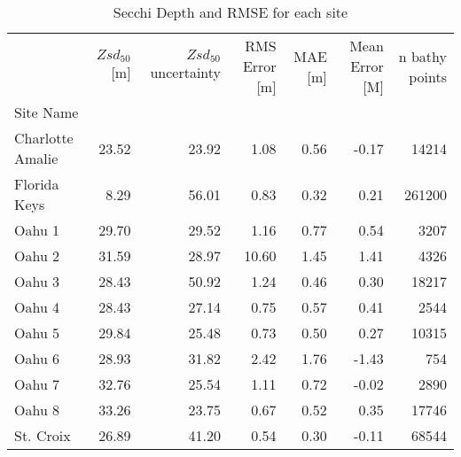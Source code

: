 \begin{table}
\centering
\caption{Secchi Depth and RMSE for each site}
\label{tab:ocean_color_summary_by_site}
\begin{tabular}{lrrrrrr}
\toprule
{} &  $Zsd_{50}$[m] &  $Zsd_{50}$ uncertainty &  RMS Error [m] &  MAE [m] &  Mean Error [M] &  n bathy points \\
Site Name        &                &                         &                &          &                 &                 \\
\midrule
Charlotte Amalie &          23.52 &                   23.92 &           1.08 &     0.56 &           -0.17 &           14214 \\
Florida Keys     &           8.29 &                   56.01 &           0.83 &     0.32 &            0.21 &          261200 \\
Oahu 1           &          29.70 &                   29.52 &           1.16 &     0.77 &            0.54 &            3207 \\
Oahu 2           &          31.59 &                   28.97 &          10.60 &     1.45 &            1.41 &            4326 \\
Oahu 3           &          28.43 &                   50.92 &           1.24 &     0.46 &            0.30 &           18217 \\
Oahu 4           &          28.43 &                   27.14 &           0.75 &     0.57 &            0.41 &            2544 \\
Oahu 5           &          29.84 &                   25.48 &           0.73 &     0.50 &            0.27 &           10315 \\
Oahu 6           &          28.93 &                   31.82 &           2.42 &     1.76 &           -1.43 &             754 \\
Oahu 7           &          32.76 &                   25.54 &           1.11 &     0.72 &           -0.02 &            2890 \\
Oahu 8           &          33.26 &                   23.75 &           0.67 &     0.52 &            0.35 &           17746 \\
St. Croix        &          26.89 &                   41.20 &           0.54 &     0.30 &           -0.11 &           68544 \\
\bottomrule
\end{tabular}
\end{table}
